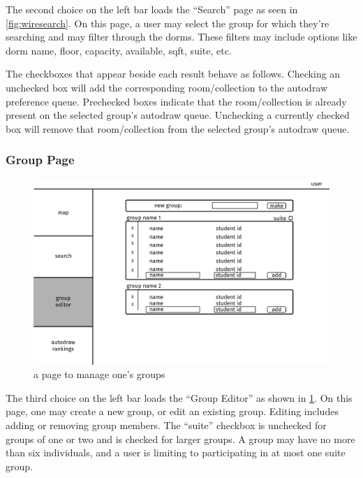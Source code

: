 The second choice on the left bar loads the ``Search'' page as seen in
\cref{fig:wiresearch}. On this page, a user may select the group for which
they're searching and may filter through the dorms. These filters may include
options like dorm name, floor, capacity, available, sqft, suite, etc.

The checkboxes that appear beside each result behave as follows. Checking an
unchecked box will add the corresponding room/collection to the autodraw
preference queue. Prechecked boxes indicate that the room/collection is already
present on the selected group's autodraw queue. Unchecking a currently checked
box will remove that room/collection from the selected group's autodraw queue.


\subsubsection{Group Page}
\begin{figure} \centering
\includegraphics[scale=.15]{wireframe/group}
\caption{a page to manage one's groups}
\label{fig:wiregroup}
\end{figure}

The third choice on the left bar loads the ``Group Editor'' as shown in
\cref{fig:wiregroup}. On this page, one may create a new group, or edit an
existing group. Editing includes adding or removing group members. The ``suite''
checkbox is unchecked for groups of one or two and is checked for larger groups.
A group may have no more than six individuals, and a user is limiting to
participating in at most one suite group.

